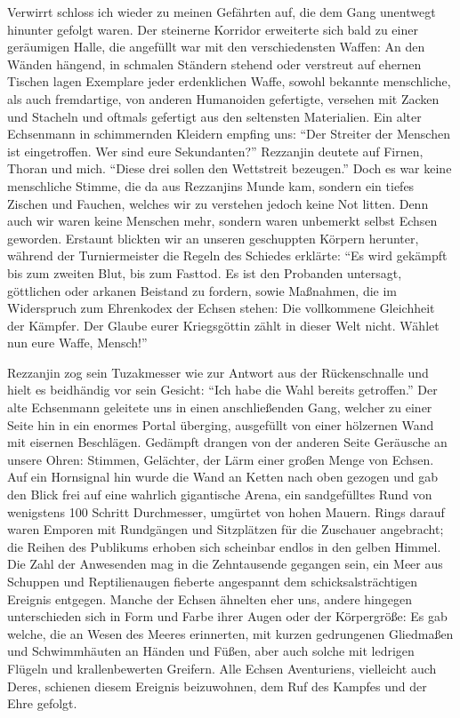 Verwirrt schloss ich wieder zu meinen Gefährten auf, die dem Gang unentwegt hinunter gefolgt waren. Der steinerne Korridor erweiterte sich bald zu einer geräumigen Halle, die angefüllt war mit den verschiedensten Waffen: An den Wänden hängend, in schmalen Ständern stehend oder verstreut auf ehernen Tischen lagen Exemplare jeder erdenklichen Waffe, sowohl bekannte menschliche, als auch fremdartige, von anderen Humanoiden gefertigte, versehen mit Zacken und Stacheln und oftmals gefertigt aus den seltensten Materialien. Ein alter Echsenmann in schimmernden Kleidern empfing uns: ``Der Streiter der Menschen ist eingetroffen. Wer sind eure Sekundanten?'' Rezzanjin deutete auf Firnen, Thoran und mich. ``Diese drei sollen den Wettstreit bezeugen.'' Doch es war keine menschliche Stimme, die da aus Rezzanjins Munde kam, sondern ein tiefes Zischen und Fauchen, welches wir zu verstehen jedoch keine Not litten. Denn auch wir waren keine Menschen mehr, sondern waren unbemerkt selbst Echsen geworden. Erstaunt blickten wir an unseren geschuppten Körpern herunter, während der Turniermeister die Regeln des Schiedes erklärte: ``Es wird gekämpft bis zum zweiten Blut, bis zum Fasttod. Es ist den Probanden untersagt, göttlichen oder arkanen Beistand zu fordern, sowie Maßnahmen, die im Widerspruch zum Ehrenkodex der Echsen stehen: Die vollkommene Gleichheit der Kämpfer. Der Glaube eurer Kriegsgöttin zählt in dieser Welt nicht. Wählet nun eure Waffe, Mensch!''

Rezzanjin zog sein Tuzakmesser wie zur Antwort aus der Rückenschnalle und hielt es beidhändig vor sein Gesicht: ``Ich habe die Wahl bereits getroffen.'' Der alte Echsenmann geleitete uns in einen anschließenden Gang, welcher zu einer Seite hin in ein enormes Portal überging, ausgefüllt von einer hölzernen Wand mit eisernen Beschlägen. Gedämpft drangen von der anderen Seite Geräusche an unsere Ohren: Stimmen, Gelächter, der Lärm einer großen Menge von Echsen. Auf ein Hornsignal hin wurde die Wand an Ketten nach oben gezogen und gab den Blick frei auf eine wahrlich gigantische Arena, ein sandgefülltes Rund von wenigstens 100 Schritt Durchmesser, umgürtet von hohen Mauern. Rings darauf waren Emporen mit Rundgängen und Sitzplätzen für die Zuschauer angebracht; die Reihen des Publikums erhoben sich scheinbar endlos in den gelben Himmel. Die Zahl der Anwesenden mag in die Zehntausende gegangen sein, ein Meer aus Schuppen und Reptilienaugen fieberte angespannt dem schicksalsträchtigen Ereignis entgegen. Manche der Echsen ähnelten eher uns, andere hingegen unterschieden sich in Form und Farbe ihrer Augen oder der Körpergröße: Es gab welche, die an Wesen des Meeres erinnerten, mit kurzen gedrungenen Gliedmaßen und Schwimmhäuten an Händen und Füßen, aber auch solche mit ledrigen Flügeln und krallenbewerten Greifern. Alle Echsen Aventuriens, vielleicht auch Deres, schienen diesem Ereignis beizuwohnen, dem Ruf des Kampfes und der Ehre gefolgt.

